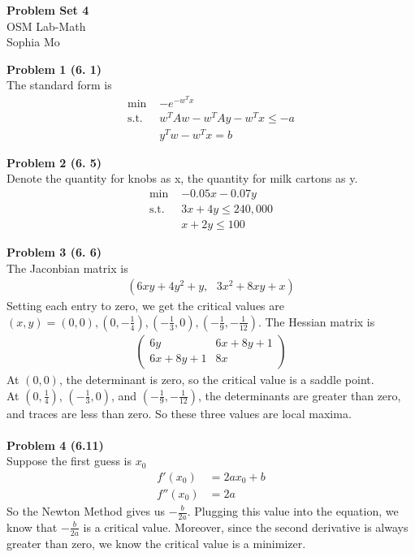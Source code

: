 \documentclass[letterpaper,12pt]{article}
\theoremstyle{definition}
\begin{document}
\begin{flushleft}
  \textbf{\large{Problem Set} 4} \\
  OSM Lab-Math \\
  Sophia Mo
\end{flushleft}

\vspace{5mm}

\noindent\textbf{Problem 1 (6. 1)} \\
The standard form  is 
\begin{align*}
\text{min   }& -e^{-w^Tx}\\
\text{s.t.   }& w^TAw - w^TAy-w^Tx\leq - a\\
& y^Tw - w^Tx = b
\end{align*}

\noindent\textbf{Problem 2 (6. 5)} \\
Denote the quantity for knobs as x, the quantity for milk cartons as y.
\begin{align*}
\text{min   }& -0.05x - 0.07y\\
\text{s.t.   }& 3x + 4y\leq 240,000\\
& x + 2y\leq 100
\end{align*}

\noindent\textbf{Problem 3 (6. 6)} \\
The Jaconbian matrix is\\
\begin{align*}
(6xy+4y^2+y,\text{  }3x^2+8xy+x )
\end{align*}
Setting each entry to zero, we get the critical values are $(x,y) = (0, 0), (0, -\frac{1}{4}), (-\frac{1}{3}, 0), (-\frac{1}{9}, -\frac{1}{12})$.
The Hessian matrix is\\
\begin{align*}
\begin{pmatrix}
6y & 6x+8y+1\\
6x+8y+1 & 8x
\end{pmatrix}
\end{align*}
At $(0, 0)$, the determinant is zero, so the critical value is a saddle point. \\
At $(0, \frac{1}{4})$, $(-\frac{1}{3}, 0)$, and $(-\frac{1}{9}, -\frac{1}{12})$, the determinants are greater than zero, and traces are less than zero. So these three values are local maxima.\\
\\
\noindent\textbf{Problem 4 (6.11)}\\
Suppose the first guess is $x_0$
\begin{align*}
f'(x_0) &= 2ax_0+b\\
f''(x_0) &= 2a
\end{align*}
So the Newton Method gives us $-\frac{b}{2a}$. Plugging this value into the equation, we know that $-\frac{b}{2a}$ is a critical value. Moreover, since the second derivative is always greater than zero, we know the critical value is a minimizer.
\end{document}
